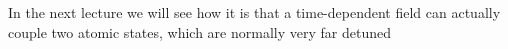 In the next lecture we will see how it is that a time-dependent field can actually couple two atomic states, which are normally very far detuned